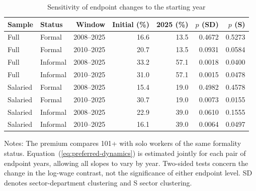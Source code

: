 \begin{table}[p]
  \centering
  \caption{Sensitivity of endpoint changes to the starting year}
  \label{tab:period-sensitivity-2010}
  \small
  \setlength{\tabcolsep}{5pt}
  \begin{tabular}{llrrrrr}
    \toprule
    Sample & Status & Window & Initial (\%) & 2025 (\%) & $p$ (SD) & $p$ (S) \\
    \midrule
    Full & Formal & 2008--2025 & 16.6 & 13.5 & 0.4672 & 0.5273 \\
    Full & Formal & 2010--2025 & 20.7 & 13.5 & 0.0931 & 0.0584 \\
    \addlinespace
    Full & Informal & 2008--2025 & 33.2 & 57.1 & 0.0018 & 0.0400 \\
    Full & Informal & 2010--2025 & 31.0 & 57.1 & 0.0015 & 0.0478 \\
    \midrule
    Salaried & Formal & 2008--2025 & 15.4 & 19.0 & 0.4982 & 0.4578 \\
    Salaried & Formal & 2010--2025 & 30.7 & 19.0 & 0.0073 & 0.0155 \\
    \addlinespace
    Salaried & Informal & 2008--2025 & 22.9 & 39.0 & 0.0610 & 0.1555 \\
    Salaried & Informal & 2010--2025 & 16.1 & 39.0 & 0.0064 & 0.0497 \\
    \bottomrule
  \end{tabular}
  \vspace{0.4em}
  \begin{minipage}{0.98\textwidth}
    \footnotesize
    Notes: The premium compares 101+ with solo workers of the same formality status. Equation~(\ref{eq:preferred-dynamics}) is estimated jointly for each pair of endpoint years, allowing all slopes to vary by year. Two-sided tests concern the change in the log-wage contrast, not the significance of either endpoint level. SD denotes sector-department clustering and S sector clustering.
  \end{minipage}
\end{table}
